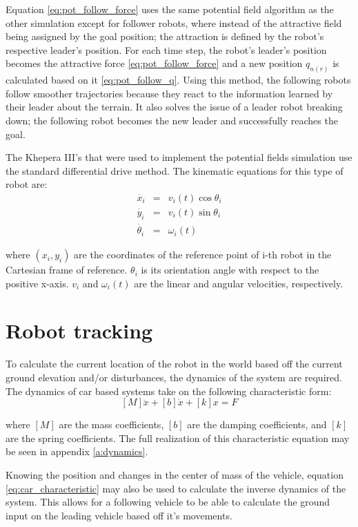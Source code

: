 Equation \eqref{eq:pot_follow_force} uses the same potential field algorithm as the other simulation except for follower robots, where instead of the attractive field being assigned by the goal position; the attraction is defined by the robot's respective leader's position. For each time step, the robot's leader's position becomes the attractive force \eqref{eq:pot_follow_force} and a new position $q_{n(r)}$ is calculated based on it \eqref{eq:pot_follow_q}. Using this method, the following robots follow smoother trajectories because they react to the information learned by their leader about the terrain. It also solves the issue of a leader robot breaking down; the following robot becomes the new leader and successfully reaches the goal.

The Khepera III's that were used to implement the potential fields simulation use the standard differential drive method. The kinematic equations for this type of robot are:
\begin{eqnarray} \label{eq:diff_drive}
	\dot{x_i} &=& v_i(t)\cos\theta_i\\
	\dot{y_i} &=& v_i(t)\sin\theta_i\\
	\dot{\theta_i} &=& \omega_i(t)
\end{eqnarray}

where $(x_i,y_i)$ are the coordinates of the reference point of i-th robot in the Cartesian frame of reference. $\theta_i$ is its orientation angle with respect to the positive x-axis. $v_i$ and $\omega_i(t)$ are the linear and angular velocities, respectively.

\section{Robot tracking}
To calculate the current location of the robot in the world based off the current ground elevation and/or disturbances, the dynamics of the system are required. The dynamics of car based systems take on the following characteristic form:
\begin{equation} \label{eq:car_characteristic}
[M]\ddot{x}+[b]\dot{x}+[k]x=F
\end{equation}

where $[M]$ are the mass coefficients, $[b]$ are the damping coefficients, and $[k]$ are the spring coefficients. The full realization of this characteristic equation may be seen in appendix \ref{a:dynamics}.

Knowing the position and changes in the center of mass of the vehicle, equation \eqref{eq:car_characteristic} may also be used to calculate the inverse dynamics of the system. This allows for a following vehicle to be able to calculate the ground input on the leading vehicle based off it's movements.

